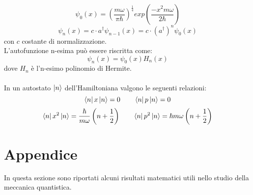 \documentclass{article}
\begin{document}
$$ \psi_0(x)= \left( \frac{m\omega}{\pi\hbar} \right)^{\frac{1}{4}}exp\left( \frac{-x^2m\omega}{2\hbar} \right)$$
$$ \psi_n(x)=c\cdot a^\dagger\psi_{n-1}(x) = c\cdot (a^\dagger)^n\psi_0(x) $$
con $c$ costante di normalizzazione.\\
L'autofunzione n-esima può essere riscritta come:
$$ \psi_n(x)=\psi_0(x)H_n(x) $$
dove $H_n$ è l'n-esimo polinomio di Hermite.\\\\
In un autostato $\ket{n}$ dell'Hamiltoniana valgono le seguenti relazioni:
$$ \bra{n}x\ket{n}=0 \qquad \bra{n}p\ket{n}=0 $$
$$ \bra{n}x^2\ket{n}=\frac{\hbar}{m\omega}\left( n+\frac{1}{2} \right) \qquad \bra{n}p^2\ket{n}=\hbar m\omega\left( n+\frac{1}{2} \right)$$

\newpage
\section{Appendice}
In questa sezione sono riportati alcuni risultati matematici utili nello studio della meccanica quantistica.
\end{document}
